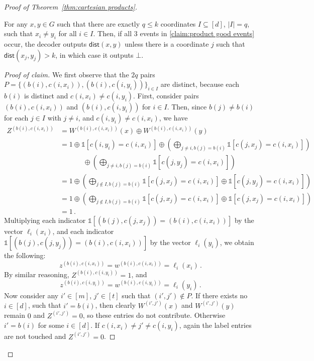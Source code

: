 \documentclass{article}
\newcommand{\dist}{\mathsf{dist}}
\newcommand{\ind}[1]{\mathds{1} \left[ #1 \right] }
\begin{document}
\begin{proof}[Proof of Theorem~\ref{thm:cartesian products}]
\begin{claim}
For any $x,y \in G$ such that there are exactly $q \leq k$ coordinates $I \subseteq [d]$, $|I|
= q$, such that $x_i \neq y_i$ for all $i \in I$. Then, if all 3 events in \cref{claim:product
good events} occur, the decoder outputs $\dist(x,y)$ unless there is a coordinate $j$ such that
$\dist(x_j,y_j) > k$, in which case it outputs $\bot$.
\end{claim}
\begin{proof}[Proof of claim]
We first observe that the $2q$ pairs $P = \{(b(i), c(i,x_i)), (b(i), c(i,y_i)) \}_{i \in I}$ are
distinct, because each $b(i)$ is distinct and $c(i,x_i) \neq c(i,y_i)$. First, consider pairs $(b(i), c(i,x_i))$ and $(b(i), c(i,y_i))$ for $i\in I$. Then, since $b(j) \neq b(i)$ for each $j \in I$ with $j \neq i$, and
$c(i,y_i) \neq c(i,x_i)$, we have
\begin{align*}
  Z^{(b(i), c(i,x_i))} &= W^{(b(i), c(i,x_i))}(x) \oplus W^{(b(i), c(i,x_i))}(y) \\
    &= 1 \oplus \ind{c(i,y_i)=c(i,x_i)}
    \oplus \left(\bigoplus_{j \neq i, b(j) = b(i)} \ind{ c(j,x_j) = c(i,x_i) } \right)
\\	&\phantom{{}={}}\qquad
    \oplus \left(\bigoplus_{j \neq i, b(j) = b(i)} \ind{ c(j,y_j) = c(i,x_i) } \right) \\
    &= 1 \oplus \left(\bigoplus_{j \notin I, b(j) = b(i)} \ind{ c(j,x_j) = c(i,x_i) } 
                                                   \oplus \ind{ c(j,y_j) = c(i,x_i) } \right) \\
    &= 1 \oplus \left(\bigoplus_{j \notin I, b(j) = b(i)} \ind{ c(j,x_j) = c(i,x_i) } 
                                                   \oplus \ind{ c(j,x_j) = c(i,x_i) } \right) \\
    &= 1 \,.
\end{align*}
Multiplying each indicator $\ind{(b(j),c(j,x_j)) =
(b(i),c(i,x_i))}$ by the vector $\ell_i(x_i)$, and each indicator $\ind{(b(j),c(j,y_j)) =
(b(i),c(i,x_i))}$ by the vector $\ell_i(y_i)$, we obtain the following:
\[
  z^{(b(i), c(i,x_i))} = w^{(b(i),c(i,x_i))} = \ell_i(x_i) \,.
\]
By similar reasoning, $Z^{(b(i), c(i,y_i))} = 1$, and
\[
  z^{(b(i), c(i,y_i))} = w^{(b(i),c(i,y_i))} = \ell_i(y_i) \,.
\]
Now consider any $i'\in[m]$, $j'\in[t]$ such that $(i',j')\notin P$.
If there exists no $i\in[d]$, such that $i' = b(i)$, then
clearly $W^{(i',j')}(x)$ and $W^{(i',j')}(y)$ remain $0$ and $Z^{(i',j')}=0$, so these entries
do not contribute.
Otherwise $i' = b(i)$ for some $i\in[d]$. 
If $c(i,x_i) \ne j' \ne c(i,y_i)$, again the label entries are not touched and $Z^{(i',j')}=0$.

\end{proof}
\end{proof}
\end{document}
